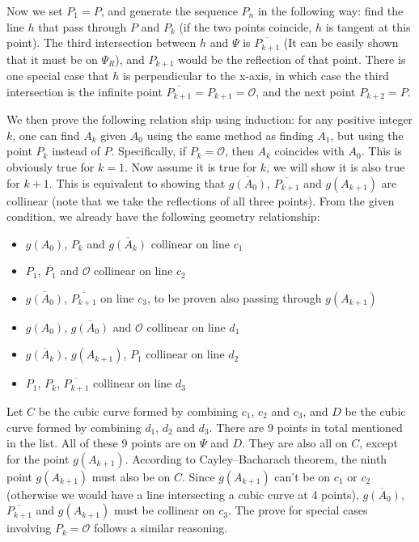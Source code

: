 \documentclass[]{article}
\begin{document}
 Now we set $P_1 = P$, and generate the sequence $P_n$ in the following way: find the line $h$ that pass through $P$ and $P_k$ (if the two points coincide, $h$ is tangent at this point). The third intersection between $h$ and $\Psi$ is $\overline{P_{k+1}}$ (It can be easily shown that it must be on $\Psi_R$), and $P_{k+1}$ would be the reflection of that point. There is one special case that $h$ is perpendicular to the x-axis, in which case the third intersection is the infinite point $\overline{P_{k+1}} = P_{k+1} = \mathcal{O}$, and the next point $P_{k+2} = P$.
 
 We then prove the following relation ship using induction: for any positive integer $k$, one can find $A_k$ given $A_0$ using the same method as finding $A_1$, but using the point $P_k$ instead of $P$. Specifically, if $P_k = \mathcal{O}$, then $A_k$ coincides with $A_0$. This is obviously true for $k = 1$. Now assume it is true for $k$, we will show it is also true for $k+1$. This is equivalent to showing that $\overline{g(A_0)}$, $\overline{P_{k+1}}$ and $g(A_{k+1})$ are collinear (note that we take the reflections of all three points). From the given condition, we already have the following geometry relationship:
\begin{itemize}
	\item $g(A_0)$, $P_k$ and $\overline{g(A_k)}$ collinear on line $c_1$
	\item $P_1$, $\overline{P_1}$ and $\mathcal{O}$ collinear on line $c_2$
	\item $\overline{g(A_0)}$, $\overline{P_{k+1}}$ on line $c_3$, to be proven also passing through $g(A_{k+1})$
	\item $g(A_0)$, $\overline{g(A_0)}$ and $\mathcal{O}$ collinear on line $d_1$
	\item $\overline{g(A_k)}$, $g(A_{k+1})$, $P_1$ collinear on line $d_2$
	\item $P_1$, $P_k$, $\overline{P_{k+1}}$ collinear on line $d_3$
\end{itemize}
Let $C$ be the cubic curve formed by combining $c_1$, $c_2$ and $c_3$, and $D$ be the cubic curve formed by combining $d_1$, $d_2$ and $d_3$. There are 9 points in total mentioned in the list. All of these 9 points are on $\Psi$ and $D$. They are also all on $C$, except for the point $g(A_{k+1})$. According to Cayley–Bacharach theorem, the ninth point $g(A_{k+1})$ must also be on $C$. Since $g(A_{k+1})$ can't be on $c_1$ or $c_2$ (otherwise we would have a line intersecting a cubic curve at 4 points), $\overline{g(A_0)}$, $\overline{P_{k+1}}$ and $g(A_{k+1})$ must be collinear on $c_3$. The prove for special cases involving $P_k = \mathcal{O}$ follows a similar reasoning.
\end{document}
